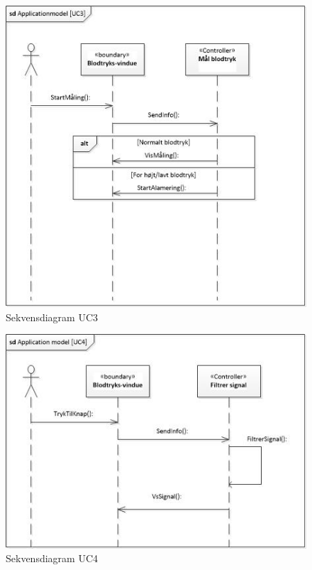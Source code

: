 \begin{figure}[H]
	\includegraphics[width=1\textwidth]{Figurer/sdAppModelUC3}
	\caption{Sekvensdiagram UC3}
	\label{sd UC3}
\end{figure}

\begin{figure}[H]
	\includegraphics[width=1\textwidth]{Figurer/sdAppModelUC4}
	\caption{Sekvensdiagram UC4}
	\label{sd UC4}
\end{figure}

